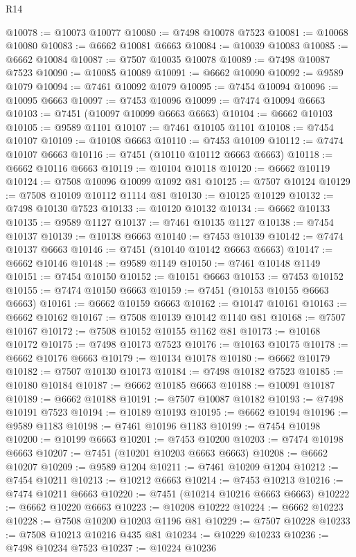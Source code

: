 \begin{lexlean}{R14}
\begin{coremodule}
@10078 := @10073 @10077
@10080 := @7498 @10078 @7523
@10081 := @10068 @10080
@10083 := @6662 @10081 @6663
@10084 := @10039 @10083
@10085 := @6662 @10084
@10087 := @7507 @10035 @10078
@10089 := @7498 @10087 @7523
@10090 := @10085 @10089
@10091 := @6662 @10090
@10092 := @9589 @1079
@10094 := @7461 @10092 @1079
@10095 := @7454 @10094
@10096 := @10095 @6663
@10097 := @7453 @10096
@10099 := @7474 @10094 @6663
@10103 := @7451 (@10097 @10099 @6663 @6663)
@10104 := @6662 @10103
@10105 := @9589 @1101
@10107 := @7461 @10105 @1101
@10108 := @7454 @10107
@10109 := @10108 @6663
@10110 := @7453 @10109
@10112 := @7474 @10107 @6663
@10116 := @7451 (@10110 @10112 @6663 @6663)
@10118 := @6662 @10116 @6663
@10119 := @10104 @10118
@10120 := @6662 @10119
@10124 := @7508 @10096 @10099 @1092 @81
@10125 := @7507 @10124
@10129 := @7508 @10109 @10112 @1114 @81
@10130 := @10125 @10129
@10132 := @7498 @10130 @7523
@10133 := @10120 @10132
@10134 := @6662 @10133
@10135 := @9589 @1127
@10137 := @7461 @10135 @1127
@10138 := @7454 @10137
@10139 := @10138 @6663
@10140 := @7453 @10139
@10142 := @7474 @10137 @6663
@10146 := @7451 (@10140 @10142 @6663 @6663)
@10147 := @6662 @10146
@10148 := @9589 @1149
@10150 := @7461 @10148 @1149
@10151 := @7454 @10150
@10152 := @10151 @6663
@10153 := @7453 @10152
@10155 := @7474 @10150 @6663
@10159 := @7451 (@10153 @10155 @6663 @6663)
@10161 := @6662 @10159 @6663
@10162 := @10147 @10161
@10163 := @6662 @10162
@10167 := @7508 @10139 @10142 @1140 @81
@10168 := @7507 @10167
@10172 := @7508 @10152 @10155 @1162 @81
@10173 := @10168 @10172
@10175 := @7498 @10173 @7523
@10176 := @10163 @10175
@10178 := @6662 @10176 @6663
@10179 := @10134 @10178
@10180 := @6662 @10179
@10182 := @7507 @10130 @10173
@10184 := @7498 @10182 @7523
@10185 := @10180 @10184
@10187 := @6662 @10185 @6663
@10188 := @10091 @10187
@10189 := @6662 @10188
@10191 := @7507 @10087 @10182
@10193 := @7498 @10191 @7523
@10194 := @10189 @10193
@10195 := @6662 @10194
@10196 := @9589 @1183
@10198 := @7461 @10196 @1183
@10199 := @7454 @10198
@10200 := @10199 @6663
@10201 := @7453 @10200
@10203 := @7474 @10198 @6663
@10207 := @7451 (@10201 @10203 @6663 @6663)
@10208 := @6662 @10207
@10209 := @9589 @1204
@10211 := @7461 @10209 @1204
@10212 := @7454 @10211
@10213 := @10212 @6663
@10214 := @7453 @10213
@10216 := @7474 @10211 @6663
@10220 := @7451 (@10214 @10216 @6663 @6663)
@10222 := @6662 @10220 @6663
@10223 := @10208 @10222
@10224 := @6662 @10223
@10228 := @7508 @10200 @10203 @1196 @81
@10229 := @7507 @10228
@10233 := @7508 @10213 @10216 @435 @81
@10234 := @10229 @10233
@10236 := @7498 @10234 @7523
@10237 := @10224 @10236

\end{coremodule}
\end{lexlean}
